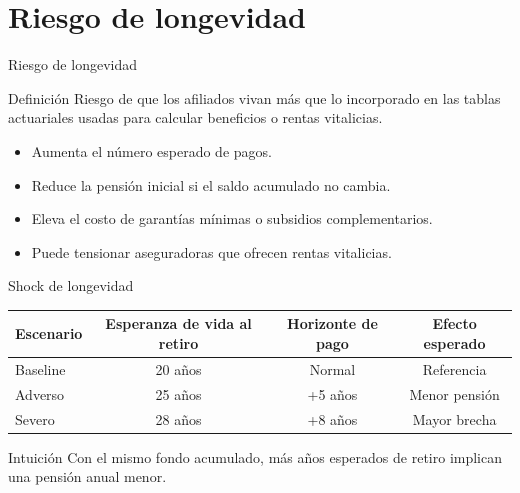 \documentclass[aspectratio=169,11pt]{beamer}
\begin{document}
\section{Riesgo de longevidad}

\begin{frame}{Riesgo de longevidad}
\begin{block}{Definición}
Riesgo de que los afiliados vivan más que lo incorporado en las tablas actuariales usadas para calcular beneficios o rentas vitalicias.
\end{block}

\begin{itemize}
  \item Aumenta el número esperado de pagos.
  \item Reduce la pensión inicial si el saldo acumulado no cambia.
  \item Eleva el costo de garantías mínimas o subsidios complementarios.
  \item Puede tensionar aseguradoras que ofrecen rentas vitalicias.
\end{itemize}
\end{frame}

\begin{frame}{Shock de longevidad}
\begin{table}
\centering
\begin{tabular}{lccc}
\toprule
Escenario & Esperanza de vida al retiro & Horizonte de pago & Efecto esperado \\
\midrule
Baseline & 20 años & Normal & Referencia \\
Adverso & 25 años & +5 años & Menor pensión \\
Severo & 28 años & +8 años & Mayor brecha \\
\bottomrule
\end{tabular}
\end{table}

\begin{alertblock}{Intuición}
Con el mismo fondo acumulado, más años esperados de retiro implican una pensión anual menor.
\end{alertblock}
\end{frame}
\end{document}
